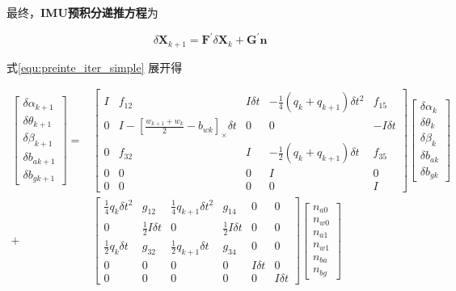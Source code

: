 \documentclass[12pt,a4paper]{article}
\begin{document}
最终，\textbf{IMU预积分递推方程}为

\begin{equation}
\label{equ:preinte_iter_simple}
\delta \mathbf{X}_{k+1} 
= \mathbf{F}^{\prime} \delta \mathbf{X}_k + \mathbf{G}^{\prime} \mathbf{n}
\end{equation}

式\eqref{equ:preinte_iter_simple} 展开得

\begin{equation}
\label{equ:preinte_iter_complete}
\begin{aligned}
\begin{bmatrix}
\delta \alpha_{k+1} \\
\delta \theta_{k+1} \\
\delta \beta_{k+1} \\
\delta b_{a{}{k+1}} \\
\delta b_{g{}{k+1}}
\end{bmatrix} =&
\begin{bmatrix}
I & f_{12} & I\delta t & -\frac{1}{4}(q_{k}+q_{k+1})\delta t^{2} & f_{15} \\
0 & I-[\frac{w_{k+1}+w_{k}}{2}-b_{wk}]_{\times } \delta t & 0 & 0 & -I\delta t \\
0 & f_{32} & I & -\frac{1}{2}(q_{k}+q_{k+1})\delta t & f_{35} \\
0 & 0 & 0 & I & 0 \\
0 & 0 & 0 & 0 & I
\end{bmatrix}
\begin{bmatrix}
\delta \alpha_{k} \\
\delta \theta_{k} \\
\delta \beta_{k} \\
\delta b_{a{}{k}} \\
\delta b_{g{}{k}}
\end{bmatrix} \\
+&
\begin{bmatrix}
\frac{1}{4}q_{k}\delta t^{2} & g_{12} & \frac{1}{4}q_{k+1}\delta t^{2} & g_{14} & 0 & 0 \\
0 & \frac{1}{2}I\delta t & 0 & \frac{1}{2}I\delta t & 0 & 0 \\
\frac{1}{2}q_{k}\delta t & g_{32} & \frac{1}{2}q_{k+1}\delta t & g_{34} & 0 & 0 \\
0 & 0 & 0 & 0 & I\delta t & 0 \\
0 & 0 & 0 & 0 & 0 & I\delta t
\end{bmatrix}
\begin{bmatrix}
n_{a0}\\
n_{w0}\\
n_{a1}\\
n_{w1}\\
n_{ba}\\
n_{bg}
\end{bmatrix}
\end{aligned}
\end{equation}
\end{document}
